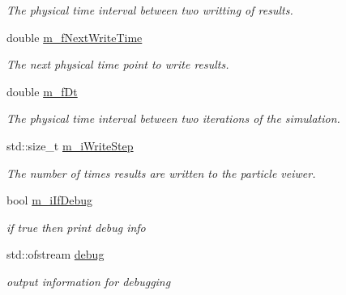 \begin{DoxyCompactItemize}
\begin{DoxyCompactList}\small\item\em The physical time interval between two writting of results. \end{DoxyCompactList}\item 
\hypertarget{classTimeController_a497f8f5542f43a7a0975bf090ad0d232}{double \hyperlink{classTimeController_a497f8f5542f43a7a0975bf090ad0d232}{m\-\_\-f\-Next\-Write\-Time}}\label{classTimeController_a497f8f5542f43a7a0975bf090ad0d232}

\begin{DoxyCompactList}\small\item\em The next physical time point to write results. \end{DoxyCompactList}\item 
\hypertarget{classTimeController_acd5be58667699b78c72210dd05425c19}{double \hyperlink{classTimeController_acd5be58667699b78c72210dd05425c19}{m\-\_\-f\-Dt}}\label{classTimeController_acd5be58667699b78c72210dd05425c19}

\begin{DoxyCompactList}\small\item\em The physical time interval between two iterations of the simulation. \end{DoxyCompactList}\item 
\hypertarget{classTimeController_ad133665c62f56e80c9c7a9d6f1820934}{std\-::size\-\_\-t \hyperlink{classTimeController_ad133665c62f56e80c9c7a9d6f1820934}{m\-\_\-i\-Write\-Step}}\label{classTimeController_ad133665c62f56e80c9c7a9d6f1820934}

\begin{DoxyCompactList}\small\item\em The number of times results are written to the particle veiwer. \end{DoxyCompactList}\item 
\hypertarget{classTimeController_ae7f35f1b1d7a84df659a0766b0a9d9d3}{bool \hyperlink{classTimeController_ae7f35f1b1d7a84df659a0766b0a9d9d3}{m\-\_\-i\-If\-Debug}}\label{classTimeController_ae7f35f1b1d7a84df659a0766b0a9d9d3}

\begin{DoxyCompactList}\small\item\em if true then print debug info \end{DoxyCompactList}\item 
\hypertarget{classTimeController_a468743ace6d8c05265e47d694590b921}{std\-::ofstream \hyperlink{classTimeController_a468743ace6d8c05265e47d694590b921}{debug}}\label{classTimeController_a468743ace6d8c05265e47d694590b921}

\begin{DoxyCompactList}\small\item\em output information for debugging \end{DoxyCompactList}\end{DoxyCompactItemize}


